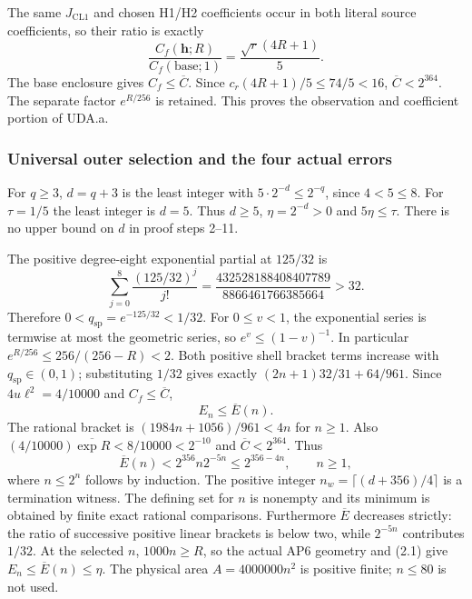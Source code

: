 \documentclass[11pt]{article}
\theoremstyle{plain}
\theoremstyle{definition}
\theoremstyle{remark}
\begin{document}
The same $J_{\mathrm{CL1}}$ and chosen H1/H2 coefficients occur in both
literal source coefficients, so their ratio is exactly
\[
 \frac{C_f(\mathbf h;R)}{C_f(\mathrm{base};1)}
 =\frac{\sqrt r(4R+1)}5.
\]
The base enclosure gives $C_f\le\overline C$. Since
$c_r(4R+1)/5\le74/5<16$, $\overline C<2^{364}$.
The separate factor $e^{R/256}$ is retained. This proves the observation
and coefficient portion of UDA.a.

\subsubsection{Universal outer selection and the four actual errors}
For $q\ge3$, $d=q+3$ is the least integer with
$5\cdot2^{-d}\le2^{-q}$, since $4<5\le8$. For $\tau=1/5$ the least
integer is $d=5$. Thus $d\ge5$, $\eta=2^{-d}>0$ and $5\eta\le\tau$.
There is no upper bound on $d$ in proof steps 2--11.

The positive degree-eight exponential partial at $125/32$ is
\[
 \sum_{j=0}^8\frac{(125/32)^j}{j!}
 =\frac{432528188408407789}{8866461766385664}>32.
\]
Therefore $0<q_{\mathrm{sp}}=e^{-125/32}<1/32$.
For $0\le v<1$, the exponential series is termwise at most the geometric
series, so $e^v\le(1-v)^{-1}$. In particular
$e^{R/256}\le256/(256-R)<2$. Both positive shell bracket terms increase
with $q_{\mathrm{sp}}\in(0,1)$; substituting $1/32$ gives exactly
$(2n+1)32/31+64/961$. Since $4u\ell^2=4/10000$ and $C_f\le\overline C$,
\begin{equation}E_n\le\overline E(n).\tag{2.1}\end{equation}
The rational bracket is $(1984n+1056)/961<4n$ for $n\ge1$.
Also $(4/10000)\overline{\exp R}<8/10000<2^{-10}$ and
$\overline C<2^{364}$. Thus
\begin{equation}
 \overline E(n)<2^{356}n2^{-5n}\le2^{356-4n},\qquad n\ge1,\tag{2.2}
\end{equation}
where $n\le2^n$ follows by induction. The positive integer
$n_w=\lceil(d+356)/4\rceil$ is a termination witness. The defining set
for $n$ is nonempty and its minimum is obtained by finite exact rational
comparisons. Furthermore $\overline E$ decreases strictly: the ratio of
successive positive linear brackets is below two, while $2^{-5n}$
contributes $1/32$. At the selected $n$, $1000n\ge R$, so the actual AP6
geometry and (2.1) give $E_n\le\overline E(n)\le\eta$.
The physical area $A=4000000n^2$ is positive finite; $n\le80$ is not used.
\end{document}
